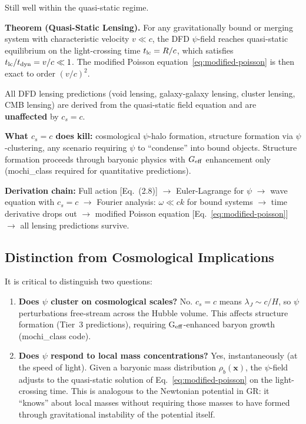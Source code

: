 \documentclass[11pt,a4paper]{article}
\newcommand{\Geff}{G_{\rm eff}}
\begin{document}
Still well within the quasi-static regime.

\begin{tcolorbox}[colback=green!5!white, colframe=green!50!black,
  title=\textbf{KEY RESULT: $c_s = c$ is Irrelevant for Lensing}]
\textbf{Theorem (Quasi-Static Lensing).}
For any gravitationally bound or merging system with characteristic velocity
$v \ll c$, the DFD $\psi$-field reaches quasi-static equilibrium on the
light-crossing time $t_{\rm lc} = R/c$, which satisfies
$t_{\rm lc}/t_{\rm dyn} = v/c \ll 1$.  The modified Poisson
equation~\eqref{eq:modified-poisson} is then exact to order $(v/c)^2$.

All DFD lensing predictions (void lensing, galaxy-galaxy lensing, cluster
lensing, CMB lensing) are derived from the quasi-static field equation
and are \textbf{unaffected} by $c_s = c$.

\medskip
\textbf{What $c_s = c$ does kill:} cosmological $\psi$-halo formation,
structure formation via $\psi$-clustering, any scenario requiring $\psi$ to
``condense'' into bound objects.  Structure formation proceeds through
baryonic physics with $\Geff$ enhancement only (mochi\_class required for
quantitative predictions).

\medskip
\textbf{Derivation chain:}
Full action [Eq.~(2.8)] $\to$ Euler-Lagrange for $\psi$ $\to$ wave equation
with $c_s = c$ $\to$ Fourier analysis: $\omega \ll ck$ for bound systems
$\to$ time derivative drops out $\to$ modified Poisson equation
[Eq.~\eqref{eq:modified-poisson}] $\to$ all lensing predictions survive.
\end{tcolorbox}

\subsection{Distinction from Cosmological Implications}

It is critical to distinguish two questions:
\begin{enumerate}
\item \textbf{Does $\psi$ cluster on cosmological scales?}  No.  $c_s = c$
  means $\lambda_J \sim c/H$, so $\psi$ perturbations free-stream across
  the Hubble volume.  This affects structure formation (Tier~3 predictions),
  requiring G$_{\rm eff}$-enhanced baryon growth (mochi\_class code).

\item \textbf{Does $\psi$ respond to local mass concentrations?}  Yes,
  instantaneously (at the speed of light).  Given a baryonic mass
  distribution $\rho_b(\mathbf{x})$, the $\psi$-field adjusts to the
  quasi-static solution of Eq.~\eqref{eq:modified-poisson} on the
  light-crossing time.  This is analogous to the Newtonian potential in
  GR: it ``knows'' about local masses without requiring those masses to
  have formed through gravitational instability of the potential itself.
\end{enumerate}
\end{document}
